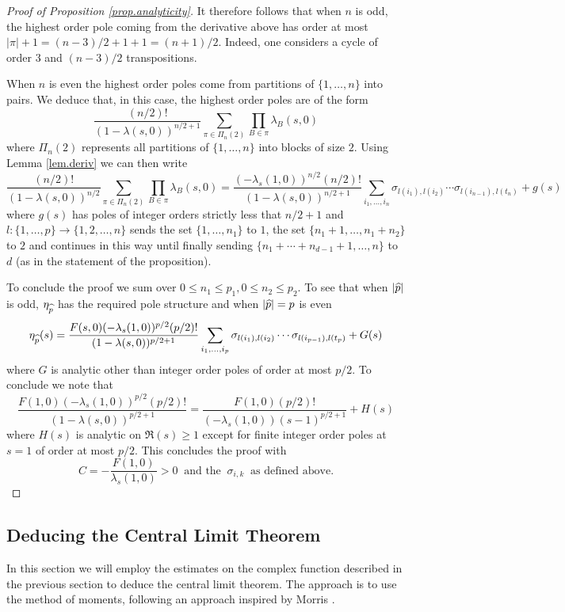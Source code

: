 \documentclass[12pt,a4paper,reqno]{amsart}
\begin{document}
\begin{proof}[Proof of Proposition \ref{prop.analyticity}]
 It therefore follows that when $n$ is odd, the highest order pole coming from the derivative above has order at most $|\pi|+1= (n - 3)/2 + 1+1  = (n+1)/2$. 
 Indeed, one considers  a cycle of  order $3$ and $(n - 3)/2$ transpositions.

When $n$ is even the highest order poles come from partitions of $\{ 1,\ldots, n\}$ into pairs. We deduce that, in this case, the highest order poles are of the form
\[
\frac{(n/2)!}{(1-\lambda(s,0))^{n/2 + 1}} \sum_{\pi \in \Pi_n(2)} \prod_{B \in \pi} \lambda_B(s,0)
\]
where $\Pi_n(2)$ represents all partitions of $\{1,\ldots, n\}$ into blocks of size $2$. Using  Lemma \ref{lem.deriv} we can then write
\[
\frac{(n/2)!}{(1-\lambda(s,0))^{n/2}} \sum_{\pi \in \Pi_n(2)} \prod_{B \in \pi} \lambda_B(s,0) = \frac{(-\lambda_s(1,0))^{n/2}(n/2)!}{(1-\lambda(s,0))^{n/2 +1}} \sum_{i_1,\ldots, i_n} \sigma_{l(i_1),l(i_2)}\cdots \sigma_{l(i_{n-1}),l(t_{n})} + g(s)
\]
where $g(s)$ has poles of integer orders strictly less that $n/2 + 1$ and $l : \{1, \ldots, p \} \to \{1,2,\ldots,n\}$ sends the set $\{1,\ldots,n_1\}$ to $1$,  the set $\{n_1+1, \ldots, n_1+n_2\}$ to $2$ and continues in this way until finally sending $\{n_1+\cdots + n_{d-1} + 1, \ldots, n\}$ to $d$ (as in the statement of the proposition).

To conclude the proof we sum over $0 \le n_1 \le p_1, 0 \le n_2 \le p_2$. To see that when $|\widehat{p}|$ is odd, $\eta_{\widehat{p}}$ has the required pole structure and when $|\widehat{p}| = p$ is even
\[
\eta_{\widehat{p}}(s) =  \frac{F(s,0)(-\lambda_s(1,0))^{p/2}(p/2)!}{(1-\lambda(s,0))^{p/2 +1}} \sum_{i_1,\ldots, i_p} \sigma_{l(i_1),l(i_2)}\cdots \sigma_{l(i_{p-1}),l(t_{p})} + G(s)
\]
where $G$ is analytic other than integer order poles of order at most $p/2$. To conclude we note that
\[
\frac{F(1,0)(-\lambda_s(1,0))^{p/2}(p/2)!}{(1-\lambda(s,0))^{p/2 +1}} = \frac{F(1,0)(p/2)!}{(-\lambda_s(1,0)) (s-1)^{p/2 + 1}} + H(s)
\]
where $H(s)$ is analytic on $\mathfrak{R}(s) \ge 1$ except for finite integer order poles at $s=1$ of order at most $p/2$.
This concludes the proof with
\[
C = - \frac{F(1,0)}{\lambda_s(1,0)} > 0 \ \text{ and the } \ \sigma_{i,k}\ \text{ as defined above.}
\]
\end{proof}



\subsection{Deducing the Central Limit Theorem} \label{subsec:CLT2}
In this section we will employ the estimates on the complex function described in the previous section 
to deduce the central limit theorem.  The approach is to use the method of moments, following an approach inspired by Morris \cite{morris}.  
\end{document}
